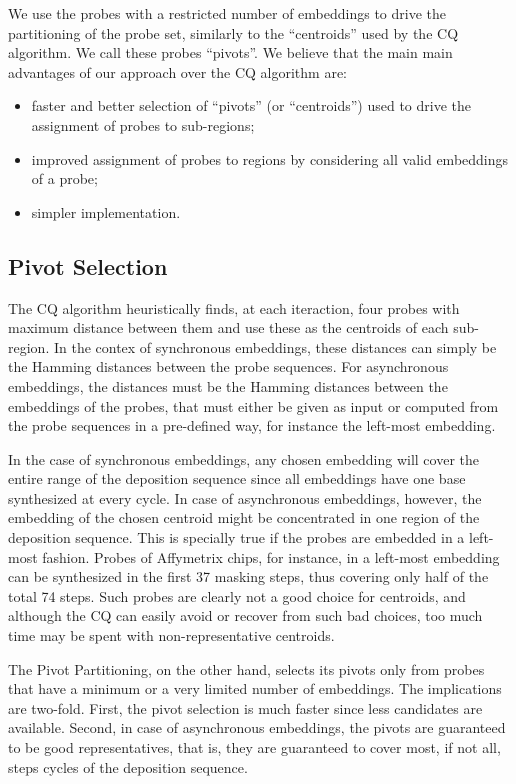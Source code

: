 \documentclass{llncs}
\begin{document}
We use the probes with a restricted number of embeddings to drive the partitioning
of the probe set, similarly to the ``centroids'' used by the CQ algorithm. We call these
probes ``pivots''. We believe that the main main advantages of our approach over the CQ
algorithm are:

\begin{itemize}
\item faster and better selection of ``pivots'' (or ``centroids'') used to drive
the assignment of probes to sub-regions;
\item improved assignment of probes to regions by considering all valid embeddings
of a probe;
\item simpler implementation.
\end{itemize}

\subsection{Pivot Selection}

The CQ algorithm heuristically finds, at each iteraction, four probes with maximum
distance between them and use these as the centroids of each sub-region. In the contex
of synchronous embeddings, these distances can simply be the Hamming distances between the
probe sequences. For asynchronous embeddings, the distances must be the Hamming distances
between the embeddings of the probes, that must either be given as input or computed from
the probe sequences in a pre-defined way, for instance the left-most embedding.

In the case of synchronous embeddings, any chosen embedding will cover the entire range of
the deposition sequence since all embeddings have one base synthesized at every cycle. In
case of asynchronous embeddings, however, the embedding of the chosen centroid might be
concentrated in one region of the deposition sequence. This is specially true if the probes
are embedded in a left-most fashion. Probes of Affymetrix chips, for instance, in a left-most
embedding can be synthesized in the first 37 masking steps, thus covering only half of the
total 74 steps. Such probes are clearly not a good choice for centroids, and although the CQ
can easily avoid or recover from such bad choices, too much time may be spent with
non-representative centroids.

The Pivot Partitioning, on the other hand, selects its pivots only from probes that have a
minimum or a very limited number of embeddings. The implications are two-fold. First, the
pivot selection is much faster since less candidates are available. Second, in case of
asynchronous embeddings, the pivots are guaranteed to be good representatives, that is, they
are guaranteed to cover most, if not all, steps cycles of the deposition sequence.
\end{document}
